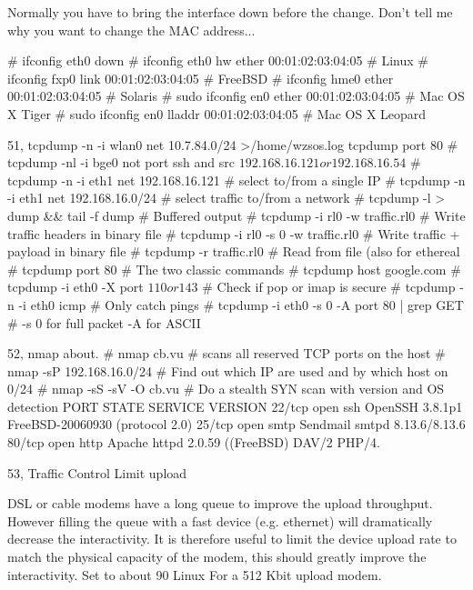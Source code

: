 Normally you have to bring the interface down before the change. Don't tell me why you want to change the MAC address...

# ifconfig eth0 down
# ifconfig eth0 hw ether 00:01:02:03:04:05      # Linux
# ifconfig fxp0 link 00:01:02:03:04:05          # FreeBSD
# ifconfig hme0 ether 00:01:02:03:04:05         # Solaris
# sudo ifconfig en0 ether 00:01:02:03:04:05     # Mac OS X Tiger
# sudo ifconfig en0 lladdr 00:01:02:03:04:05    # Mac OS X Leopard

51, tcpdump -n -i wlan0 net 10.7.84.0/24 >/home/wzsos.log
tcpdump port 80
# tcpdump -nl -i bge0 not port ssh and src \(192.168.16.121 or 192.168.16.54\)
# tcpdump -n -i eth1 net 192.168.16.121           # select to/from a single IP
# tcpdump -n -i eth1 net 192.168.16.0/24          # select traffic to/from a network
# tcpdump -l > dump && tail -f dump               # Buffered output
# tcpdump -i rl0 -w traffic.rl0                   # Write traffic headers in binary file
# tcpdump -i rl0 -s 0 -w traffic.rl0              # Write traffic + payload in binary file
# tcpdump -r traffic.rl0                          # Read from file (also for ethereal
# tcpdump port 80                                 # The two classic commands
# tcpdump host google.com
# tcpdump -i eth0 -X port \(110 or 143\)          # Check if pop or imap is secure
# tcpdump -n -i eth0 icmp                         # Only catch pings
# tcpdump -i eth0 -s 0 -A port 80 | grep GET      # -s 0 for full packet -A for ASCII

52, nmap about.
# nmap cb.vu               # scans all reserved TCP ports on the host
# nmap -sP 192.168.16.0/24 # Find out which IP are used and by which host on 0/24
# nmap -sS -sV -O cb.vu    # Do a stealth SYN scan with version and OS detection
PORT      STATE  SERVICE             VERSION
22/tcp    open   ssh                 OpenSSH 3.8.1p1 FreeBSD-20060930 (protocol 2.0)
25/tcp    open   smtp                Sendmail smtpd 8.13.6/8.13.6
80/tcp    open   http                Apache httpd 2.0.59 ((FreeBSD) DAV/2 PHP/4.

53, Traffic Control
Limit upload

DSL or cable modems have a long queue to improve the upload throughput. However filling the queue with a fast device (e.g. ethernet) will dramatically decrease the interactivity. It is therefore useful to limit the device upload rate to match the physical capacity of the modem, this should greatly improve the interactivity. Set to about 90%
Linux
For a 512 Kbit upload modem.

